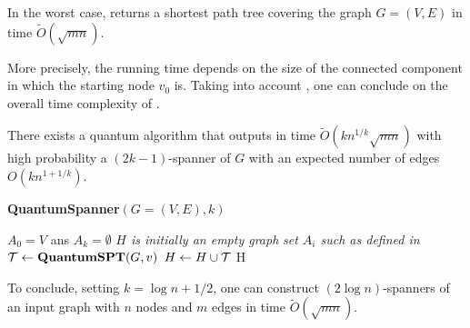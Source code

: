 


\begin{theorem}\label{thm:comp-spt}
In the worst case,  returns a shortest path tree covering the graph $G=(V,E)$ in time $\tilde{O}(\sqrt{mn})$. 
\end{theorem}

More precisely, the running time depends on the size of the connected component in which the starting node $v_0$ is.
Taking into account , one can conclude on the overall time complexity of .

\begin{theorem}
There exists a quantum algorithm that outputs in time $\tilde{O}(k n^{1/k} \sqrt{mn})$ with high probability a $(2k-1)$-spanner of $G$ with an expected number of edges $O(k n^{1+1/k})$. 
\label{th:q-spanner}
\end{theorem}

\begin{algorithm}[H]\label{alg:quantum-spanner}
\caption{\textbf{QuantumSpanner}$(G=(V,E), k)$}\label{alg:quantum-spanner}
\begin{algorithmic}[1]
    \Require $A_0 = V$ ans $A_k = \emptyset$
    \Ensure \textit{$H$ is initially an empty graph}
        \textit{set $A_i$ such as defined in } 
    \EndIf
        \State $\mathcal T \leftarrow \mathbf{QuantumSPT}(G, v)$
        \State $H \leftarrow H \cup \mathcal T$
    \EndFor
    \EndFor
    \State \Return H
\end{algorithmic}
\end{algorithm}


To conclude, setting $k= \log n + 1/2 $, one can construct 
$(2 \log n)$-spanners of an input graph with $n$ nodes and $m$ edges
in time $\tilde{O}(\sqrt{mn})$. 
